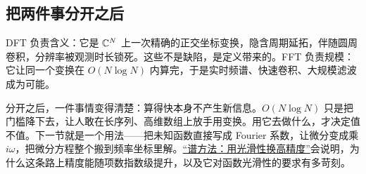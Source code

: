 \subsection{把两件事分开之后}

DFT 负责含义：它是 \(\mathbb{C}^N\) 上一次精确的正交坐标变换，隐含周期延拓，伴随圆周卷积，分辨率被观测时长锁死。这些不是缺陷，是定义带来的。FFT 负责规模：它让同一个变换在 \(O(N\log N)\) 内算完，于是实时频谱、快速卷积、大规模滤波成为可能。

分开之后，一件事情变得清楚：算得快本身不产生新信息。\(O(N\log N)\) 只是把门槛降下去，让人敢在长序列、高维数组上放手用变换。用它去做什么，才决定值不值。下一节就是一个用法——把未知函数直接写成 Fourier 系数，让微分变成乘 \(i\omega\)，把微分方程整个搬到频率坐标里解。\hyperref[sec:08-Numerical-Analysis/08-Fourier-and-Spectral-Methods/04]{``谱方法：用光滑性换高精度''}会说明，为什么这条路上精度能随项数指数级提升，以及它对函数光滑性的要求有多苛刻。

